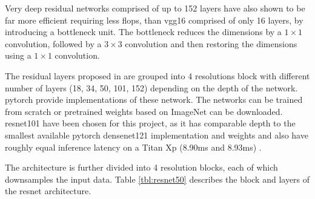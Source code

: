 Very deep residual networks comprised of up to 152 layers have also shown to be far more efficient requiring less \gls{flop}s, than \gls{vgg}16 comprised of only 16 layers, by introducing a bottleneck unit. The bottleneck reduces the dimensions by a $1 \times 1$ convolution, followed by a $3 \times 3$ convolution and then restoring the dimensions using a $1 \times 1$ convolution. 

The residual layers proposed in \cite{} are grouped into 4 resolutions block with different number of layers (18, 34, 50, 101, 152) depending on the depth of the network. \gls{pytorch} provide implementations of these network. The networks can be trained from scratch or pretrained weights based on ImageNet can be downloaded. \gls{resnet}101 have been chosen for this project, as it has comparable depth to the smallest available \gls{pytorch} \gls{densenet}121 implementation and weights and also have roughly equal inference latency on a Titan Xp (8.90ms and 8.93ms) \cite{bianco_benchmark_2018}.


The architecture is further divided into 4 resolution blocks, each of which downsamples the input data. Table \ref{tbl:resnet50} describes the block and layers of the \gls{resnet} architecture. 

